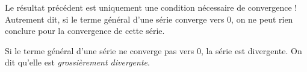 \documentclass[french,11pt,twoside]{VcCours}
\newcommand{\Sum}[2]{\ensuremath{\textstyle{\sum\limits_{#1}^{#2}}}}
\begin{document}
\begin{Remarque}{}
	\warning{} Le résultat précédent est uniquement une condition nécessaire de convergence ! Autrement dit, si le terme général d'une série converge vers $0$, on ne peut rien conclure pour la convergence de cette série. 
\end{Remarque}

\begin{Corollaire}{}
Si le terme général d'une série ne converge pas vers $0$, la série est divergente. On dit qu'elle est \emph{grossièrement divergente}.
\end{Corollaire}

%
\end{document}
